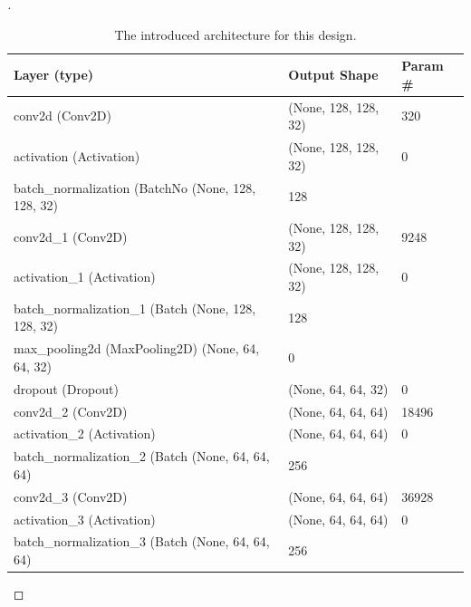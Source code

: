 \documentclass[12pt,oneside,geqno]{article}
\begin{document}
\begin{proof}[\color{red}{Solution}]
		\begin{table}[]
			\caption{The introduced architecture for this design.}
			\label{tab:arch}
			\begin{tabular}{lll}
				\hline
				\multicolumn{1}{|l|}{Layer (type)}                  & \multicolumn{1}{l|}{Output Shape} & \multicolumn{1}{l|}{Param \#} \\ \hline
				conv2d (Conv2D)                                     & (None, 128, 128, 32)              & 320                           \\
				activation (Activation)                             & (None, 128, 128, 32)              & 0                             \\
				batch\_normalization (BatchNo (None, 128, 128, 32)  & 128                               &                               \\
				conv2d\_1 (Conv2D)                                  & (None, 128, 128, 32)              & 9248                          \\
				activation\_1 (Activation)                          & (None, 128, 128, 32)              & 0                             \\
				batch\_normalization\_1 (Batch (None, 128, 128, 32) & 128                               &                               \\
				max\_pooling2d (MaxPooling2D) (None, 64, 64, 32)    & 0                                 &                               \\
				dropout (Dropout)                                   & (None, 64, 64, 32)                & 0                             \\
				conv2d\_2 (Conv2D)                                  & (None, 64, 64, 64)                & 18496                         \\
				activation\_2 (Activation)                          & (None, 64, 64, 64)                & 0                             \\
				batch\_normalization\_2 (Batch (None, 64, 64, 64)   & 256                               &                               \\
				conv2d\_3 (Conv2D)                                  & (None, 64, 64, 64)                & 36928                         \\
				activation\_3 (Activation)                          & (None, 64, 64, 64)                & 0                             \\
				batch\_normalization\_3 (Batch (None, 64, 64, 64)   & 256                               &                               \\

\end{tabular}
\end{table}
\end{proof}
\end{document}
